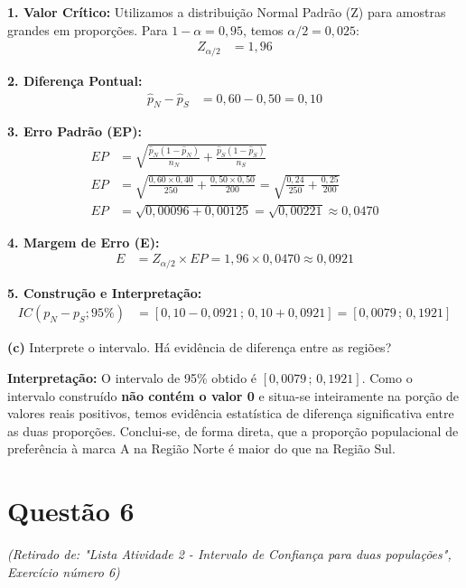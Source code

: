 \documentclass[12pt, a4paper]{article}
\begin{document}
\noindent \textbf{1. Valor Crítico:} Utilizamos a distribuição Normal Padrão (Z) para amostras grandes em proporções. Para $1-\alpha = 0,95$, temos $\alpha/2 = 0,025$:
\begin{align*}
Z_{\alpha/2} &= \boxed{1,96}
\end{align*}

\noindent \textbf{2. Diferença Pontual:}
\begin{align*}
\hat{p}_N - \hat{p}_S &= 0,60 - 0,50 = \boxed{0,10}
\end{align*}

\noindent \textbf{3. Erro Padrão (EP):}
\begin{align*}
EP &= \sqrt{\frac{\hat{p}_N(1-\hat{p}_N)}{n_N} + \frac{\hat{p}_S(1-\hat{p}_S)}{n_S}} \\
EP &= \sqrt{\frac{0,60 \times 0,40}{250} + \frac{0,50 \times 0,50}{200}} = \sqrt{\frac{0,24}{250} + \frac{0,25}{200}} \\
EP &= \sqrt{0,00096 + 0,00125} = \sqrt{0,00221} \approx \boxed{0,0470}
\end{align*}

\noindent \textbf{4. Margem de Erro (E):}
\begin{align*}
E &= Z_{\alpha/2} \times EP = 1,96 \times 0,0470 \approx \boxed{0,0921}
\end{align*}

\noindent \textbf{5. Construção e Interpretação:}
\begin{align*}
IC(p_N - p_S; 95\%) &= [0,10 - 0,0921 \,;\, 0,10 + 0,0921] = \boxed{[0,0079 \,;\, 0,1921]}
\end{align*}


\medskip\noindent\textbf{(c)} Interprete o intervalo. Há evidência de diferença entre as regiões?

\noindent \textbf{Interpretação:} O intervalo de 95\% obtido é $[0,0079 \,;\, 0,1921]$. Como o intervalo construído \textbf{não contém o valor 0} e situa-se inteiramente na porção de valores reais positivos, temos evidência estatística de diferença significativa entre as duas proporções. Conclui-se, de forma direta, que a proporção populacional de preferência à marca A na Região Norte é maior do que na Região Sul.

\section*{Questão 6}
\textit{(Retirado de: "Lista Atividade 2 - Intervalo de Confiança para duas populações", Exercício número 6)}
\end{document}
